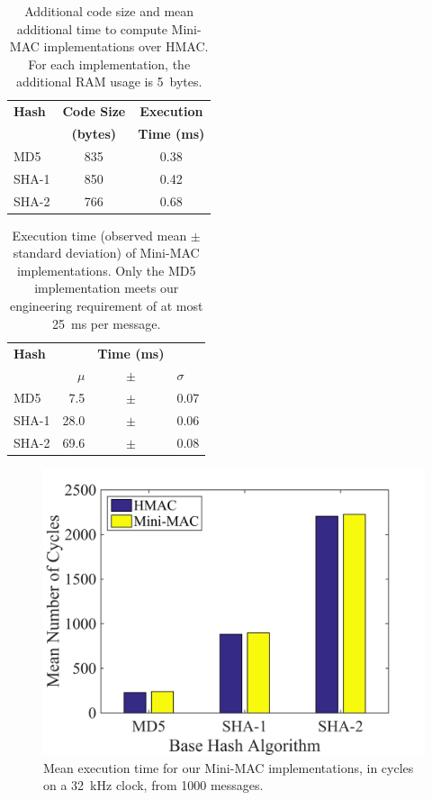 \begin{table}	
	\centering	
	\caption{Additional code size and mean additional time to compute Mini-MAC implementations over HMAC.
	For each implementation, the additional RAM usage is 5~bytes.}
	\label{tab-overhead}
	\vspace{8pt}
	\begin{tabular}{l|c|c}
	\bfseries Hash & \bfseries Code Size  & \bfseries Execution\\
	& \bfseries (bytes) & \bfseries Time (ms)\\\hline 
	MD5 & 835 & 0.38 \\
	SHA-1 & 850 & 0.42 \\
	SHA-2 & 766 & 0.68 \\
	\end{tabular}
	\end{table}
	
	\begin{table}
	\centering
	\caption{Execution time (observed mean $\pm$ standard deviation) of Mini-MAC implementations.
	Only the MD5 implementation meets our engineering requirement of at most 25~ms per message.}
	\label{tab-time}
	\vspace{8pt}
	\begin{tabular}{ @{}l | rcl}
	\hspace{2pt}\textbf{Hash} && {\textbf{Time (ms)}}&\\
		& $\mu$ & $\pm$ & $\sigma$   \\
		\hline 
		\hspace{2pt}MD5 	& 7.5 		& $\pm$ 	& 0.07 \\
		\hspace{2pt}SHA-1 	& 28.0 		& $\pm$		& 0.06 \\
		\hspace{2pt}SHA-2 	& 69.6 		& $\pm$		& 0.08 \\ 
	\end{tabular}	
	\end{table}
	
	\begin{figure}
		\centering
		\includegraphics[width=\columnwidth]{figures/exec_cycles.png}
		\caption{Mean execution time for our Mini-MAC implementations, in cycles on a 32~kHz clock,
		from 1000 messages.}
		\label{fig-execution}
	\end{figure}
	
